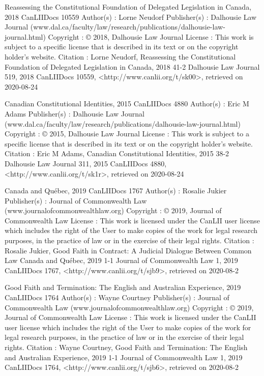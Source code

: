 Reassessing the Constitutional Foundation of Delegated Legislation in Canada, 2018 CanLIIDocs 10559
Author(s) : 	Lorne Neudorf
Publisher(s) : 	Dalhousie Law Journal (www.dal.ca/faculty/law/research/publications/dalhousie-law-journal.html)
Copyright : 	© 2018, Dalhousie Law Journal
License : 	This work is subject to a specific license that is described in its text or on the copyright holder's website.
Citation : 	Lorne Neudorf, Reassessing the Constitutional Foundation of Delegated Legislation in Canada, 2018 41-2 Dalhousie Law Journal 519, 2018 CanLIIDocs 10559, <http://www.canlii.org/t/sk00>, retrieved on 2020-08-24



Canadian Constitutional Identities, 2015 CanLIIDocs 4880
Author(s) : 	Eric M Adams
Publisher(s) : 	Dalhousie Law Journal (www.dal.ca/faculty/law/research/publications/dalhousie-law-journal.html)
Copyright : 	© 2015, Dalhousie Law Journal
License : 	This work is subject to a specific license that is described in its text or on the copyright holder's website.
Citation : 	Eric M Adams, Canadian Constitutional Identities, 2015 38-2 Dalhousie Law Journal 311, 2015 CanLIIDocs 4880, <http://www.canlii.org/t/sk1r>, retrieved on 2020-08-24



Canada and Québec, 2019 CanLIIDocs 1767
Author(s) : 	Rosalie Jukier
Publisher(s) : 	Journal of Commonwealth Law (www.journalofcommonwealthlaw.org)
Copyright : 	© 2019, Journal of Commonwealth Law
License : 	This work is licensed under the CanLII user license which includes the right of the User to make copies of the work for legal research purposes, in the practice of law or in the exercise of their legal rights.
Citation : 	Rosalie Jukier, Good Faith in Contract: A Judicial Dialogue Between Common Law Canada and Québec, 2019 1-1 Journal of Commonwealth Law 1, 2019 CanLIIDocs 1767, <http://www.canlii.org/t/sjb9>, retrieved on 2020-08-2


Good Faith and Termination: The English and Australian Experience, 2019 CanLIIDocs 1764
Author(s) : 	Wayne Courtney
Publisher(s) : 	Journal of Commonwealth Law (www.journalofcommonwealthlaw.org)
Copyright : 	© 2019, Journal of Commonwealth Law
License : 	This work is licensed under the CanLII user license which includes the right of the User to make copies of the work for legal research purposes, in the practice of law or in the exercise of their legal rights.
Citation : 	Wayne Courtney, Good Faith and Termination: The English and Australian Experience, 2019 1-1 Journal of Commonwealth Law 1, 2019 CanLIIDocs 1764, <http://www.canlii.org/t/sjb6>, retrieved on 2020-08-2


